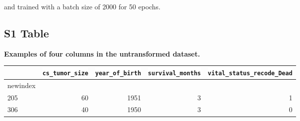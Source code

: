 \documentclass[10pt,letterpaper]{article}
\newcommand{\codewhite}[1]{\colorbox{white}{\texttt{#1}}}
\begin{document}
and trained with a batch size of 2000 for 50 epochs.


\subsection*{S1 Table}
\label{S1_Table}
{\bf Examples of four columns in the untransformed dataset.}
\begin{table}[H]
\begin{adjustwidth}{-2.25in}{0in} %
\begin{tabular}{lrrrr}
\toprule
{} &  \codewhite{cs\_tumor\_size} &  \codewhite{year\_of\_birth} &  \codewhite{survival\_months} &  \codewhite{vital\_status\_recode\_Dead} \\
\midrule
newindex &                &                &        &            \\
205      &             60 &           1951 &      3 &          1 \\
306      &            40  &         1950  &      3    &     0    \\
\bottomrule
\end{tabular}
\end{adjustwidth}
\end{table}
\end{document}
